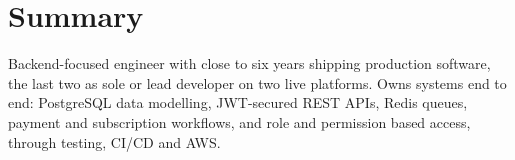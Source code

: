 \section{Summary}
\begin{itemize}[leftmargin=0.15in, label={}]
	\small{
	\item Backend-focused engineer with close to six years shipping production software, the last two as
	      sole or lead developer on two live platforms. Owns systems end to end: PostgreSQL data
	      modelling, JWT-secured REST APIs, Redis queues, payment and subscription workflows, and role
	      and permission based access, through testing, CI/CD and AWS.
	      }
\end{itemize}
